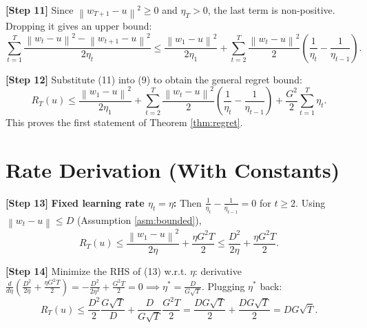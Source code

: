 \documentclass{article}
\newcommand{\norm}[1]{\left\| #1 \right\|}
\newcommand{\step}[1]{\textbf{[Step #1]}}
\begin{document}
\step{11} Since $\norm{w_{T+1} - u}^2 \ge 0$ and $\eta_T > 0$, the last term is non-positive. Dropping it gives an upper bound:
\begin{equation}
    \sum_{t=1}^T \frac{\norm{w_t - u}^2 - \norm{w_{t+1} - u}^2}{2\eta_t} \le \frac{\norm{w_1 - u}^2}{2\eta_1} + \sum_{t=2}^T \frac{\norm{w_t - u}^2}{2} \left( \frac{1}{\eta_t} - \frac{1}{\eta_{t-1}} \right). \tag{11}
\end{equation}

\step{12} Substitute (11) into (9) to obtain the general regret bound:
\begin{equation}
    R_T(u) \le \frac{\norm{w_1 - u}^2}{2\eta_1} + \sum_{t=2}^T \frac{\norm{w_t - u}^2}{2} \left( \frac{1}{\eta_t} - \frac{1}{\eta_{t-1}} \right) + \frac{G^2}{2} \sum_{t=1}^T \eta_t. \tag{12}
\end{equation}
This proves the first statement of Theorem \ref{thm:regret}.

\section*{Rate Derivation (With Constants)}

\step{13} \textbf{Fixed learning rate $\eta_t = \eta$:} Then $\frac{1}{\eta_t} - \frac{1}{\eta_{t-1}} = 0$ for $t \ge 2$. Using $\norm{w_t - u} \le D$ (Assumption \ref{asm:bounded}),
\begin{equation}
    R_T(u) \le \frac{\norm{w_1 - u}^2}{2\eta} + \frac{\eta G^2 T}{2} \le \frac{D^2}{2\eta} + \frac{\eta G^2 T}{2}. \tag{13}
\end{equation}

\step{14} Minimize the RHS of (13) w.r.t. $\eta$: derivative $\frac{d}{d\eta} \left( \frac{D^2}{2\eta} + \frac{\eta G^2 T}{2} \right) = -\frac{D^2}{2\eta^2} + \frac{G^2 T}{2} = 0 \implies \eta^* = \frac{D}{G\sqrt{T}}$.
Plugging $\eta^*$ back:
\begin{equation}
    R_T(u) \le \frac{D^2}{2} \frac{G\sqrt{T}}{D} + \frac{D}{G\sqrt{T}} \frac{G^2 T}{2} = \frac{DG\sqrt{T}}{2} + \frac{DG\sqrt{T}}{2} = D G \sqrt{T}. \tag{14}
\end{equation}
\end{document}
